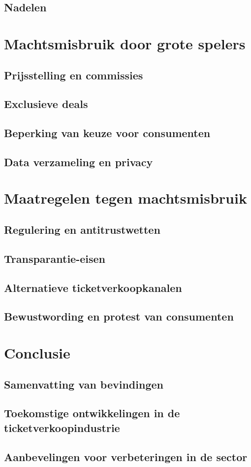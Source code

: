 \documentclass[a4paper,10pt]{article}
\begin{document}
\subsection{Nadelen}

\section{Machtsmisbruik door grote spelers}
\subsection{Prijsstelling en commissies}
\subsection{Exclusieve deals}
\subsection{Beperking van keuze voor consumenten}
\subsection{Data verzameling en privacy}

\section{Maatregelen tegen machtsmisbruik}
\subsection{Regulering en antitrustwetten}
\subsection{Transparantie-eisen}
\subsection{Alternatieve ticketverkoopkanalen}
\subsection{Bewustwording en protest van consumenten}

\section{Conclusie}
\subsection{Samenvatting van bevindingen}
\subsection{Toekomstige ontwikkelingen in de ticketverkoopindustrie}
\subsection{Aanbevelingen voor verbeteringen in de sector}

% 




\end{document}
